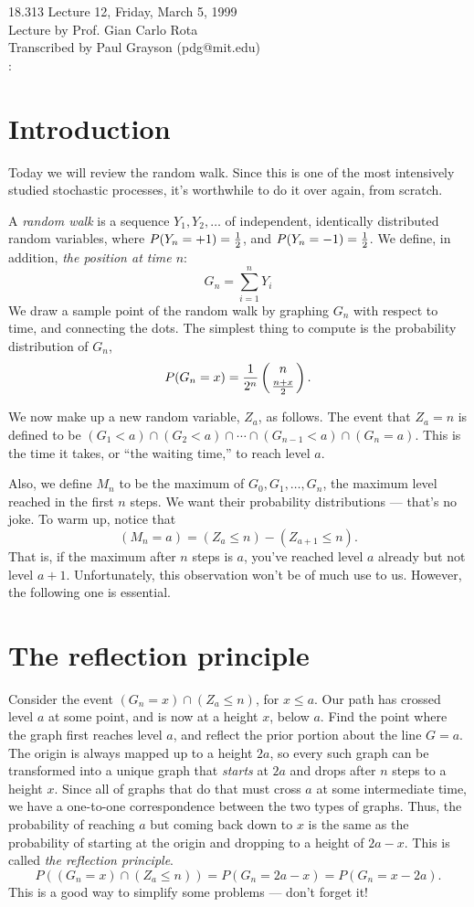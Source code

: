 {\Large 18.313 Lecture 12, Friday, March 5, 1999}\\ 
{\large Lecture by Prof. Gian Carlo Rota}\\
Transcribed by Paul Grayson (pdg@mit.edu)\\

:

\section{Introduction}\label{sec-intro}
Today we will review the random walk.  Since this is one of the most
intensively studied stochastic processes, it's worthwhile to do it
over again, from scratch.

A {\sl random walk} is a sequence $Y_1, Y_2, \ldots$ of independent,
identically distributed random variables, where
$P(Y_n=+1) = {1\over 2}$, and $P(Y_n=-1) = {1\over 2}$.
We define, in addition, {\sl the position at time $n$}:
$$G_n = \sum_{i=1}^n Y_i$$
We draw a sample point of the random walk by graphing $G_n$ with
respect to time, and connecting the dots.  The simplest thing to
compute is the probability distribution of $G_n$,
$$P(G_n=x) = {1\over 2^n} \left( n \atop {n+x \over 2} \right).$$

We now make up a new random variable, $Z_a$, as follows.  The event
that $Z_a=n$ is defined to be
$(G_1<a)\cap(G_2<a)\cap\cdots\cap(G_{n-1}<a)\cap(G_n=a).$  This is
the time it takes, or ``the waiting time,'' to reach level $a$.

Also, we define $M_n$ to be the maximum of $G_0,G_1,\ldots,G_n$, the
maximum level reached in the first $n$ steps.  We want their
probability distributions --- that's no joke.  To warm up, notice
that $$(M_n=a) = (Z_a\le n)-(Z_{a+1}\le n).$$  That is, if the maximum
after $n$ steps is $a$, you've reached level $a$ already but not level
$a+1$.  Unfortunately, this observation won't be of much use to us.
However, the following one is essential.

\section{The reflection principle}\label{sec-reflec}
Consider the event $(G_n=x)\cap(Z_a\le n)$, for $x\le a$.  Our path
has crossed level $a$ at some point, and is now at a height $x$, below
$a$.  Find the point where the graph first reaches level $a$, and
reflect the prior portion about the line $G=a$.  The origin is always
mapped up to a height $2a$, so every such graph can be transformed
into a unique graph that {\sl starts\/} at $2a$ and drops after $n$
steps to a 
height $x$.  Since all of graphs that do that must cross $a$ at some
intermediate time, we have a one-to-one correspondence between the two
types of graphs.  Thus, the probability of reaching $a$ but coming
back down to $x$ is the same as the probability of starting at the
origin and dropping to a height of $2a-x$.  This is called {\sl the
reflection principle}.
$$P((G_n=x)\cap(Z_a\le n)) = P(G_n=2a-x) = P(G_n=x-2a).$$
This is a good way to simplify some problems --- don't forget it!


